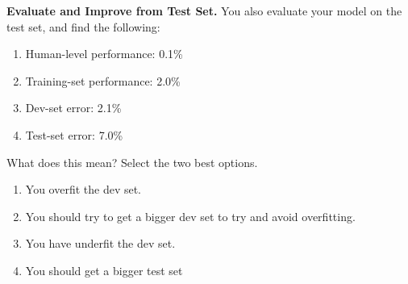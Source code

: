 \item{}
\textbf{Evaluate and Improve from Test Set.}
You also evaluate your model on the test set, and find the following:
\begin{enumerate}
    \item Human-level performance: 0.1\%
    \item Training-set performance: 2.0\%
    \item Dev-set error: 2.1\%
    \item Test-set error: 7.0\%
\end{enumerate}

What does this mean? Select the two best options.

\begin{enumerate}[label=(\alph*)]
    \item You overfit the dev set.
    \item You should try to get a bigger dev set to try and avoid overfitting.
    \item You have underfit the dev set.
    \item You should get a bigger test set 
\end{enumerate} 
